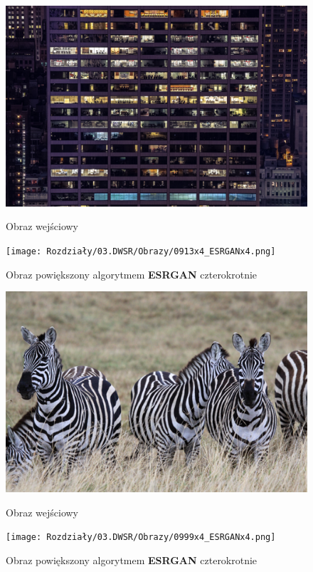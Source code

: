 \begin{figure}[ht]
    \centering
    \begin{minipage}[t]{0.45\linewidth}
        \includegraphics[width=\linewidth]{Rozdziały/03.DWSR/Obrazy/0913x4.png}
        \caption{Obraz wejściowy}
        \label{fig:image69}
    \end{minipage}
    \hspace{0.5cm}
    \begin{minipage}[t]{0.45\linewidth}
        \texttt{[image: Rozdziały/03.DWSR/Obrazy/0913x4\_ESRGANx4.png]}
        \caption{Obraz powiększony algorytmem \textbf{ESRGAN} czterokrotnie}
        \label{fig:image70}
    \end{minipage}
\end{figure}

\begin{figure}[ht]
    \centering
    \begin{minipage}[t]{0.45\linewidth}
        \includegraphics[width=\linewidth]{Rozdziały/03.DWSR/Obrazy/0999x4.png}
        \caption{Obraz wejściowy}
        \label{fig:image71}
    \end{minipage}
    \hspace{0.5cm}
    \begin{minipage}[t]{0.45\linewidth}
        \texttt{[image: Rozdziały/03.DWSR/Obrazy/0999x4\_ESRGANx4.png]}
        \caption{Obraz powiększony algorytmem \textbf{ESRGAN} czterokrotnie}
        \label{fig:image72}
    \end{minipage}
\end{figure}